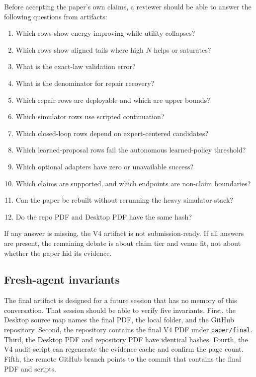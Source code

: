 Before accepting the paper's own claims, a reviewer should be able to answer
the following questions from artifacts:
\begin{enumerate}
\item Which rows show energy improving while utility collapses?
\item Which rows show aligned tails where high \(N\) helps or saturates?
\item What is the exact-law validation error?
\item What is the denominator for repair recovery?
\item Which repair rows are deployable and which are upper bounds?
\item Which simulator rows use scripted continuation?
\item Which closed-loop rows depend on expert-centered candidates?
\item Which learned-proposal rows fail the autonomous learned-policy
threshold?
\item Which optional adapters have zero or unavailable success?
\item Which claims are supported, and which endpoints are non-claim
boundaries?
\item Can the paper be rebuilt without rerunning the heavy simulator stack?
\item Do the repo PDF and Desktop PDF have the same hash?
\end{enumerate}

If any answer is missing, the V4 artifact is not submission-ready. If all
answers are present, the remaining debate is about claim tier and venue fit,
not about whether the paper hid its evidence.

\subsection{Fresh-agent invariants}
\label{app:V4-fresh-agent-invariants}

The final artifact is designed for a future session that has no memory of this
conversation. That session should be able to verify five invariants. First,
the Desktop source map names the final PDF, the local folder, and the GitHub
repository. Second, the repository contains the final V4 PDF under
\texttt{paper/final}. Third, the Desktop PDF and repository PDF have identical
hashes. Fourth, the V4 audit script can regenerate the evidence cache and
confirm the page count. Fifth, the remote GitHub branch points to the commit
that contains the final PDF and scripts.

